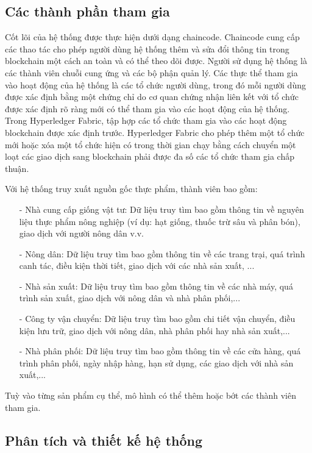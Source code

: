 \subsection{Các thành phần tham gia}

Cốt lõi của hệ thống được thực hiện dưới dạng chaincode. Chaincode cung cấp các thao tác cho phép người dùng hệ thống thêm và sửa đổi 
thông tin trong blockchain một cách an toàn và có thể theo dõi được. Người sử dụng hệ thống
là các thành viên chuỗi cung ứng và các bộ phận quản lý. Các thực thể tham gia 
vào hoạt động của hệ thống là các tổ chức người dùng, trong đó mỗi người dùng được xác định 
bằng một chứng chỉ do cơ quan chứng nhận liên kết với tổ chức được xác định rõ ràng mới có thể 
tham gia vào các hoạt động của hệ thống. Trong Hyperledger Fabric, tập hợp các tổ chức tham 
gia vào các hoạt động blockchain được xác định trước. Hyperledger Fabric cho phép thêm một tổ 
chức mới hoặc xóa một tổ chức hiện có trong thời gian chạy bằng cách chuyển một loạt các 
giao dịch sang blockchain phải được đa số các tổ chức tham gia chấp thuận.

Với hệ thống truy xuất nguồn gốc thực phẩm, thành viên bao gồm: 
\begin{itemize}
    \item[-] Nhà cung cấp giống vật tư: Dữ liệu truy tìm bao gồm thông tin về nguyên liệu 
    thực phẩm nông nghiệp (ví dụ: hạt giống, thuốc trừ sâu và phân bón), giao dịch với người nông dân v.v.
    \item[-] Nông dân: Dữ liệu truy tìm bao gồm thông tin về các trang trại, quá trình canh tác,
    điều kiện thời tiết, giao dịch với các nhà sản xuất, ...
    \item[-] Nhà sản xuất: Dữ liệu truy tìm bao gồm thông tin về các nhà máy, quá trình sản xuất,
    giao dịch với nông dân và nhà phân phối,...
    \item[-] Công ty vận chuyển: Dữ liệu truy tìm bao gồm chi tiết vận chuyển, điều kiện lưu trữ, giao
    dịch với nông dân, nhà phân phối hay nhà sản xuất,...
    \item[-] Nhà phân phối: Dữ liệu truy tìm bao gồm thông tin về các cửa hàng, quá trình phân phối,
    ngày nhập hàng, hạn sử dụng, các giao dịch với nhà sản xuất,...
\end{itemize}

Tuỳ vào từng sản phẩm cụ thể, mô hình có thể thêm hoặc bớt các thành viên tham gia. 
\subsection{Phân tích và thiết kế hệ thống}
